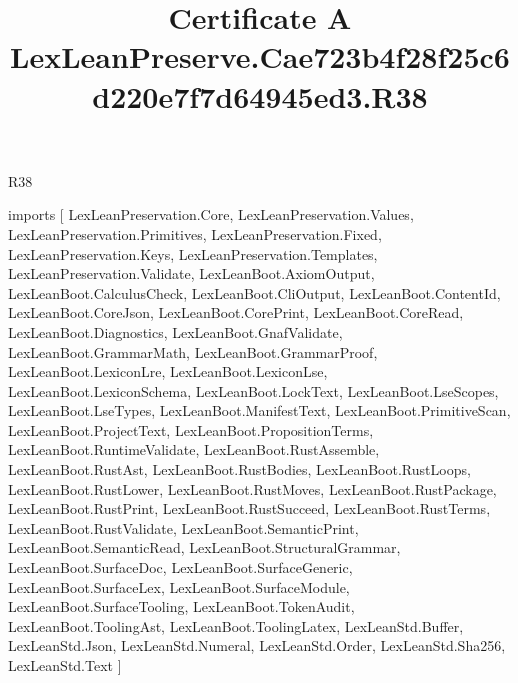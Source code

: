 \begin{lexlean}{R38}
\title{Certificate A LexLeanPreserve.Cae723b4f28f25c6d220e7f7d64945ed3.R38}
\begin{coremodule}
imports [
  LexLeanPreservation.Core,
  LexLeanPreservation.Values,
  LexLeanPreservation.Primitives,
  LexLeanPreservation.Fixed,
  LexLeanPreservation.Keys,
  LexLeanPreservation.Templates,
  LexLeanPreservation.Validate,
  LexLeanBoot.AxiomOutput,
  LexLeanBoot.CalculusCheck,
  LexLeanBoot.CliOutput,
  LexLeanBoot.ContentId,
  LexLeanBoot.CoreJson,
  LexLeanBoot.CorePrint,
  LexLeanBoot.CoreRead,
  LexLeanBoot.Diagnostics,
  LexLeanBoot.GnafValidate,
  LexLeanBoot.GrammarMath,
  LexLeanBoot.GrammarProof,
  LexLeanBoot.LexiconLre,
  LexLeanBoot.LexiconLse,
  LexLeanBoot.LexiconSchema,
  LexLeanBoot.LockText,
  LexLeanBoot.LseScopes,
  LexLeanBoot.LseTypes,
  LexLeanBoot.ManifestText,
  LexLeanBoot.PrimitiveScan,
  LexLeanBoot.ProjectText,
  LexLeanBoot.PropositionTerms,
  LexLeanBoot.RuntimeValidate,
  LexLeanBoot.RustAssemble,
  LexLeanBoot.RustAst,
  LexLeanBoot.RustBodies,
  LexLeanBoot.RustLoops,
  LexLeanBoot.RustLower,
  LexLeanBoot.RustMoves,
  LexLeanBoot.RustPackage,
  LexLeanBoot.RustPrint,
  LexLeanBoot.RustSucceed,
  LexLeanBoot.RustTerms,
  LexLeanBoot.RustValidate,
  LexLeanBoot.SemanticPrint,
  LexLeanBoot.SemanticRead,
  LexLeanBoot.StructuralGrammar,
  LexLeanBoot.SurfaceDoc,
  LexLeanBoot.SurfaceGeneric,
  LexLeanBoot.SurfaceLex,
  LexLeanBoot.SurfaceModule,
  LexLeanBoot.SurfaceTooling,
  LexLeanBoot.TokenAudit,
  LexLeanBoot.ToolingAst,
  LexLeanBoot.ToolingLatex,
  LexLeanStd.Buffer,
  LexLeanStd.Json,
  LexLeanStd.Numeral,
  LexLeanStd.Order,
  LexLeanStd.Sha256,
  LexLeanStd.Text
]


\end{coremodule}
\end{lexlean}

